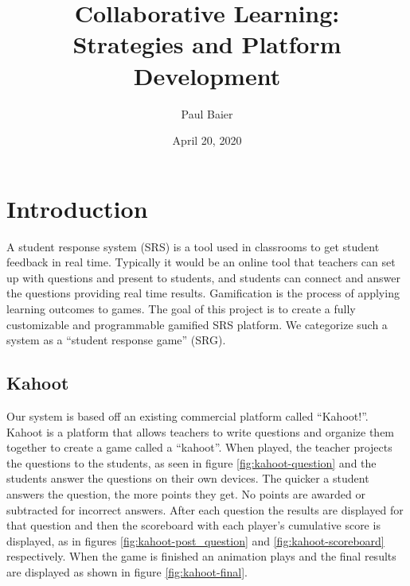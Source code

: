 \documentclass{article}
\title{Collaborative Learning: \\
\normalsize Strategies and Platform Development
}
\author{Paul Baier}
\date{April 20, 2020}
\begin{document}
\maketitle

\section{Introduction}
A student response system (SRS) is a tool used in classrooms to get student feedback in real time. Typically it would be an online tool that teachers can set up with questions and present to students, and students can connect and answer the questions providing real time results. Gamification is the process of applying learning outcomes to games. The goal of this project is to create a fully customizable and programmable gamified SRS platform. We categorize such a system as a ``student response game'' (SRG). 

\subsection{Kahoot}
Our system is based off an existing commercial platform called ``Kahoot!''. Kahoot is a platform that allows teachers to write questions and organize them together to create a game called a ``kahoot''. When played, the teacher projects the questions to the students, as seen in figure \ref{fig:kahoot-question} and the students answer the questions on their own devices. The quicker a student answers the question, the more points they get. No points are awarded or subtracted for incorrect answers. After each question the results are displayed for that question and then the scoreboard with each player's cumulative score is displayed, as in figures \ref{fig:kahoot-post_question} and \ref{fig:kahoot-scoreboard} respectively. When the game is finished an animation plays and the final results are displayed as shown in figure \ref{fig:kahoot-final}.
\end{document}
